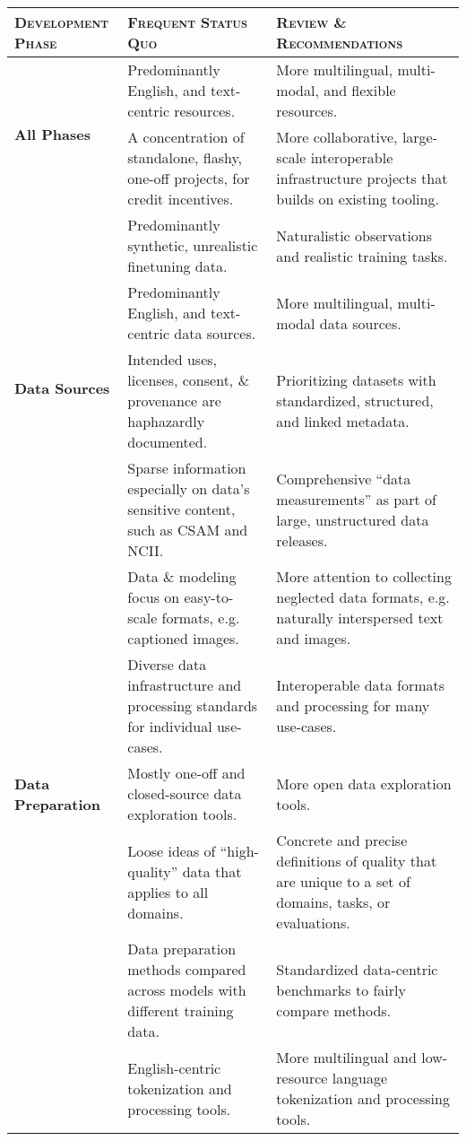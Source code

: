 \begin{table*}[t!]
\centering
\scriptsize
\renewcommand{\arraystretch}{1.5} %
\begin{adjustbox}{width=\textwidth}
\begin{tabular}{m{2.5cm} m{7cm} m{7cm}} %
\toprule
\textsc{Development Phase} & \textsc{Frequent Status Quo} & \textsc{Review \& Recommendations}\\
\midrule

\multirow{2}{*}{\textbf{All Phases}} & Predominantly English, and text-centric resources. & More multilingual, multi-modal, and flexible resources. \\
& A concentration of standalone, flashy, one-off projects, for credit incentives. & More collaborative, large-scale interoperable infrastructure projects that builds on existing tooling. \\
\midrule

\multirow{4}{*}{\textbf{Data Sources}} & Predominantly synthetic, unrealistic finetuning data. & Naturalistic observations and realistic training tasks. \\
& Predominantly English, and text-centric data sources. & More multilingual, multi-modal data sources. \\
& Intended uses, licenses, consent, \& provenance are haphazardly documented. & Prioritizing datasets with standardized, structured, and linked metadata. \\
& Sparse information especially on data's sensitive content, such as CSAM and NCII. & Comprehensive ``data measurements'' as part of large, unstructured data releases. \\
& Data \& modeling focus on easy-to-scale formats, e.g. captioned images. & More attention to collecting neglected data formats, e.g. naturally interspersed text and images. \\

\midrule
\multirow{3}{*}{\textbf{Data Preparation}} & Diverse data infrastructure and processing standards for individual use-cases. & Interoperable data formats and processing for many use-cases. \\
& Mostly one-off and closed-source data exploration tools. & More open data exploration tools. \\
& Loose ideas of ``high-quality'' data that applies to all domains. & Concrete and precise definitions of quality that are unique to a set of domains, tasks, or evaluations.\\
& Data preparation methods compared across models with different training data. & Standardized data-centric benchmarks to fairly compare methods. \\
& English-centric tokenization and processing tools. & More multilingual and low-resource language tokenization and processing tools. \\


\end{tabular}
\end{adjustbox}
\end{table*}
